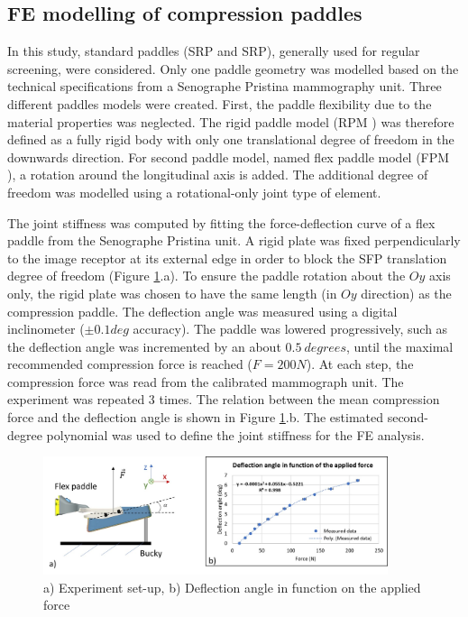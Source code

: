 \subsection{FE modelling of compression paddles}
In this study, standard paddles (SRP and SRP), generally used for regular screening, were considered. Only one paddle geometry was modelled based on the technical specifications from a Senographe Pristina mammography unit. Three different paddles models were created. First, the paddle flexibility due to the material properties was neglected. The rigid paddle model (RPM ) was therefore defined as a fully rigid body with only one translational degree of freedom in the downwards direction. For second paddle model, named flex paddle model (FPM ), a rotation around the longitudinal axis is added. The additional degree of freedom was modelled using a rotational-only joint type of element.

The joint stiffness was computed by fitting the force-deflection curve of a flex paddle from the Senographe Pristina unit. A rigid plate was fixed perpendicularly to the image receptor at its external edge in order to block the SFP translation degree of freedom (Figure \ref{fig:deflectionangle}.a). To ensure the paddle rotation about the $Oy$ axis only, the rigid plate was chosen to have the same length (in $Oy$ direction) as the compression paddle. The deflection angle was measured using a digital inclinometer ($\pm0.1deg$ accuracy). The paddle was lowered progressively, such as the deflection angle was incremented by an about $0.5\ degrees$, until the maximal recommended compression force is reached ($F=200N$). At each step, the compression force was read from the calibrated mammograph unit. The experiment was repeated 3 times. The relation between the mean compression force and the deflection angle is shown in Figure \ref{fig:deflectionangle}.b. The estimated second-degree polynomial was used to define the joint stiffness for the FE analysis.

\begin{figure}[!h]
\centering
\includegraphics[width=0.9\textwidth,keepaspectratio]{figures/deflectionAngle.jpg} 
\caption{ a) Experiment set-up, b) Deflection angle in function on the applied force }\label{fig:deflectionangle}
\end{figure}

